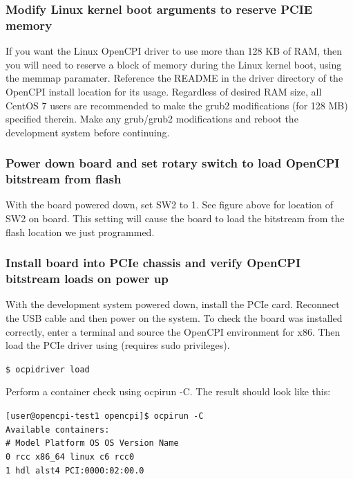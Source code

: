 \documentclass{article}
\newcommand{\shellcmd}[1]{\texttt{\$ #1\\}}
\newcommand{\terminaloutput}[1]{\texttt{#1}}
\begin{document}
\subsubsection*{Modify Linux kernel boot arguments to reserve PCIE memory}
If you want the Linux OpenCPI driver to use more than 128 KB of RAM, then you will need to reserve a block of memory during the Linux kernel boot, using the memmap paramater. Reference the README in the driver directory of the OpenCPI install location for its usage. Regardless of desired RAM size, all CentOS 7 users are recommended to make the grub2 modifications (for 128 MB) specified therein. Make any grub/grub2 modifications and reboot the development system before continuing.

\subsubsection*{Power down board and set rotary switch to load OpenCPI bitstream from flash}
With the board powered down, set SW2 to 1. See figure above for location of SW2 on board. This setting will cause the board to load the bitstream from the flash location we just programmed.\par
\subsubsection*{Install board into PCIe chassis and verify OpenCPI bitstream loads on power up}
With the development system powered down, install the PCIe card. Reconnect the USB cable and then power on the system. To check the board was installed correctly, enter a terminal and source the OpenCPI environment for x86. Then load the PCIe driver using (requires sudo privileges).\par\bigskip
\noindent\shellcmd{ocpidriver load}\par\bigskip
\noindent Perform a container check using ocpirun -C. The result should look like this:\par\bigskip
\noindent\terminaloutput{[user@opencpi-test1 opencpi]\$ ocpirun -C\\
Available containers:\\
 \#  Model\hspace{6ex} Platform\hspace{3ex}    OS\hspace{5ex}     OS Version\hspace{1ex}  Name\\
 0  rcc\hspace{9ex}   x86\_64\hspace{5ex}      linux\hspace{2ex}  c6\hspace{10ex}          rcc0\\
 1  hdl\hspace{9ex}   alst4\hspace{29ex}                          PCI:0000:02:00.0
}
\end{document}
